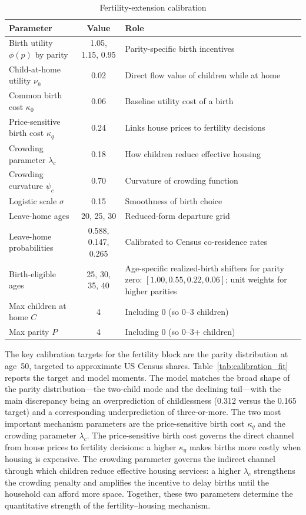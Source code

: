 \begin{table}[htbp]
\centering
\caption{Fertility-extension calibration}
\label{tab:fertility_calibration_full}
\small
\begin{tabular}{p{}cp{}}
\toprule
Parameter & Value & Role \\
\midrule
Birth utility $\phi(p)$ by parity & 1.05, 1.15, 0.95 & Parity-specific birth incentives \\
Child-at-home utility $\nu_h$ & 0.02 & Direct flow value of children while at home \\
Common birth cost $\kappa_0$ & 0.06 & Baseline utility cost of a birth \\
Price-sensitive birth cost $\kappa_q$ & 0.24 & Links house prices to fertility decisions \\
Crowding parameter $\lambda_c$ & 0.18 & How children reduce effective housing \\
Crowding curvature $\psi_c$ & 0.70 & Curvature of crowding function \\
Logistic scale $\sigma$ & 0.15 & Smoothness of birth choice \\
Leave-home ages & 20, 25, 30 & Reduced-form departure grid \\
Leave-home probabilities & 0.588, 0.147, 0.265 & Calibrated to Census co-residence rates \\
Birth-eligible ages & 25, 30, 35, 40 & Age-specific realized-birth shifters for parity zero: $[1.00, 0.55, 0.22, 0.06]$; unit weights for higher parities \\
Max children at home $C$ & 4 & Including 0 (so 0--3 children) \\
Max parity $P$ & 4 & Including 0 (so 0--3+ children) \\
\bottomrule
\end{tabular}
\end{table}

The key calibration targets for the fertility block are the parity distribution at age~50, targeted to approximate US Census shares. Table~\ref{tab:calibration_fit} reports the target and model moments. The model matches the broad shape of the parity distribution---the two-child mode and the declining tail---with the main discrepancy being an overprediction of childlessness (0.312 versus the 0.165 target) and a corresponding underprediction of three-or-more. The two most important mechanism parameters are the price-sensitive birth cost $\kappa_q$ and the crowding parameter $\lambda_c$. The price-sensitive birth cost governs the direct channel from house prices to fertility decisions: a higher $\kappa_q$ makes births more costly when housing is expensive. The crowding parameter governs the indirect channel through which children reduce effective housing services: a higher $\lambda_c$ strengthens the crowding penalty and amplifies the incentive to delay births until the household can afford more space. Together, these two parameters determine the quantitative strength of the fertility--housing mechanism.


